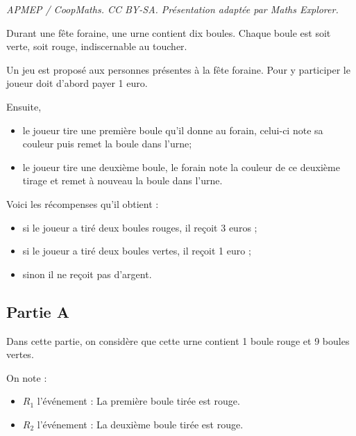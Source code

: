 \documentclass[10pt]{article}
\begin{document}
\noindent\textit{APMEP / CoopMaths. CC BY-SA. Présentation adaptée par Maths Explorer.}\par\medskip
Durant une fête foraine, une urne contient dix boules. Chaque boule est soit verte, soit rouge, indiscernable au toucher.

	Un jeu est proposé aux personnes présentes à la fête foraine. Pour y participer le joueur doit d'abord payer 1 euro.

	Ensuite,
	\begin{itemize}[left=5mm,label={\textbullet~~}]
		\item le joueur tire une première boule qu'il donne au forain, celui-ci note sa couleur puis remet la boule dans l'urne;

		\item le joueur tire une deuxième boule, le forain note la couleur de ce deuxième tirage et remet à nouveau la boule dans l'urne.
	\end{itemize}

	Voici les récompenses qu'il obtient :
	\begin{itemize}[left=5mm,label={\textbullet~~}]
		\item si le joueur a tiré deux boules rouges, il reçoit 3 euros ;
		\item si le joueur a tiré deux boules vertes, il reçoit 1 euro ;
		\item sinon il ne reçoit pas d'argent.
	\end{itemize}

\subsection*{Partie A}
Dans cette partie, on considère que cette urne contient 1 boule rouge et 9 boules vertes.

On note :

\begin{itemize}[left=5mm,label={\textbullet~~}]
	\item $R_{1}$ l'événement : \og La première boule tirée est rouge. \fg{}
	\item $R_{2}$ l'événement : \og La deuxième boule tirée est rouge. \fg{}
\end{itemize}
\end{document}
